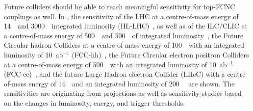 \clearpage
Future colliders should be able to reach meaningful sensitivity for top-FCNC couplings as well. In , the sensitivity of the LHC at a centre-of-mass energy of 14~\TeV\ and 3000~\fbinv\ integrated luminosity (HL-LHC)~\cite{Agashe:2013hma}, as well as of the ILC/CLIC at a centre-of-mass energy of 500~\GeV\ and 500~\fbinv\ of integrated luminosity~\cite{Mangano:2016jyj}, the  Future Circular hadron Colliders at a centre-of-mass energy of 100~\TeV\ with an integrated luminosity of 10~ab$^{-1}$ (FCC-hh)~\cite{Agashe:2013hma}, the Future Circular electron positron Colliders at a centre-of-mass energy of 500~\GeV\ with an integrated luminosity of 10~ab$^{-1}$ (FCC-ee)~\cite{Khanpour:2014xla}, and the future Large Hadron electron Collider (LHeC) with a centre-of-mass energy of 14~\TeV\ and an integrated luminosity of 200~\fbinv~\cite{Liu:2015kkp} are shown. The sensitivities are originating from projections as well as sensitivity studies based on the changes in luminosity, energy, and trigger thresholds. 


